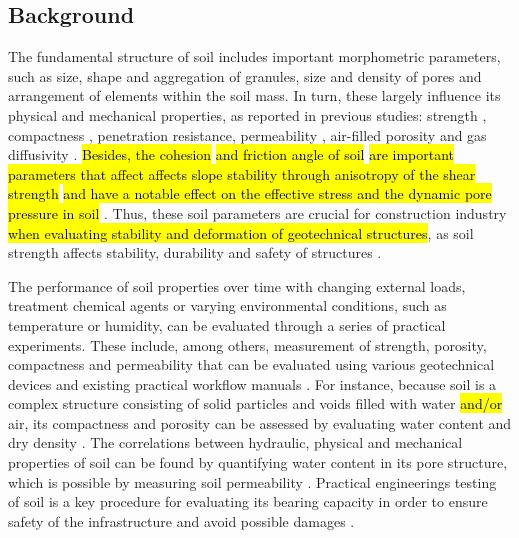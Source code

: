 \documentclass{amestyle}
\begin{document}
\subsection{Background} 
The fundamental structure of soil includes important morphometric parameters, such as size, shape and aggregation of granules, size and density of pores and arrangement of elements within the soil mass. In turn, these largely influence its physical and mechanical properties, as reported in previous studies: strength \cite{5775686}, compactness \cite{5774579,9082607,WANG2022100703}, penetration resistance, permeability \cite{GAO2022100754,CHOONG2022107075}, air-filled porosity \cite{POHL2021115124,ZHANG2021105738,ZIEGLERRIVERA2021103194} and gas diffusivity \cite{Ball}. \hl{Besides, the cohesion} \cite{Deviren,KIM2021106163} \hl{and friction angle of soil} \cite{MARZULLI2021813,ZOU20191,KAYA2009252} \hl{are important parameters that affect affects slope stability through anisotropy of the shear strength} \cite{WANG20161055,STOCKTON201931} \hl{and have a notable effect on the effective stress and the dynamic pore pressure in soil} \cite{YE2012111}. {Thus, these} soil parameters are crucial for construction industry \hl{when evaluating stability and deformation of geotechnical structures}, as soil strength affects stability, durability and safety of structures \cite{747690,6802685,KULKARNI2022125363,ZHANG2020119293,WANG2022100703}. 

The performance of soil properties over time with changing external loads, treatment chemical agents or varying environmental conditions, such as temperature or humidity, can be evaluated through a series of practical experiments. These include, among others, measurement of strength, porosity, compactness and permeability that can be evaluated using various geotechnical devices and existing practical workflow manuals \cite{Day2001,Davis2008}. For instance, because soil is a complex structure consisting of solid particles and voids filled with water \hl{and/or} air, its compactness and porosity can be assessed by evaluating water content and dry density \cite{Hillel}. The correlations between hydraulic, physical and mechanical properties of soil can be found by quantifying water content in its pore structure, which is possible by measuring soil permeability \cite{BARBOSA2022115673}. Practical engineerings testing of soil is a key procedure for evaluating its bearing capacity in order to ensure safety of the infrastructure and avoid possible damages \cite{OBIANYO2020120677,BAKAIYANG2021e00626,HAN20181187,KAMAL20212660}. 
\end{document}
